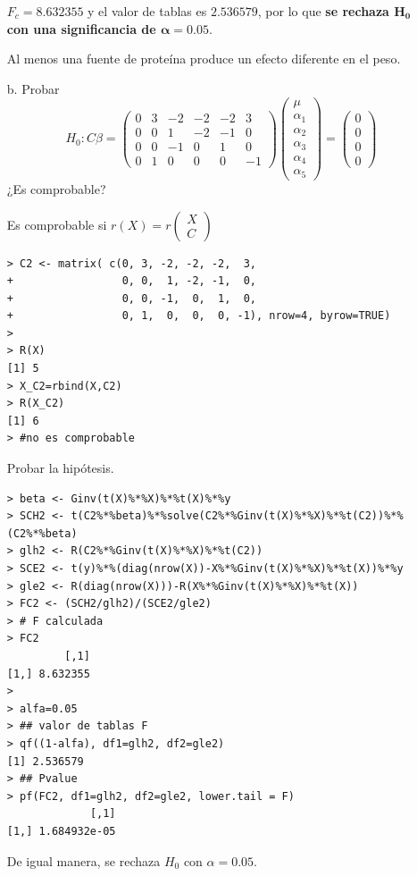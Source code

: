 \documentclass[12pt,a4paper]{report}
\begin{document}
\begin{enumerate}

$F_c = 8.632355$ y el valor de tablas es $2.536579$,  por lo que \textbf{se rechaza $\boldsymbol{H_0}$ con una significancia de $\boldsymbol{\alpha = 0.05}$}. 

Al menos una fuente de proteína produce un efecto diferente en el peso.




\item[b.] Probar
\[H_0: C\beta = \begin{pmatrix}
0 & 3 & -2 & -2 & -2 & 3 \\
0 & 0 & 1 & -2 & -1 & 0 \\
0 & 0 & -1 & 0 & 1 & 0 \\
0 & 1 & 0 & 0 & 0 & -1
\end{pmatrix}
\begin{pmatrix}
\mu \\ \alpha_1 \\ \alpha_2 \\ \alpha_3 \\ \alpha_4 \\ \alpha_5
\end{pmatrix} = \begin{pmatrix}
0 \\ 0 \\ 0 \\ 0
\end{pmatrix}\]
¿Es comprobable?


Es comprobable si $r(X)=r\begin{pmatrix} X \\ C \end{pmatrix}$


\begin{verbatim}
> C2 <- matrix( c(0, 3, -2, -2, -2,  3,
+                 0, 0,  1, -2, -1,  0,
+                 0, 0, -1,  0,  1,  0,
+                 0, 1,  0,  0,  0, -1), nrow=4, byrow=TRUE)
> 
> R(X)
[1] 5
> X_C2=rbind(X,C2)
> R(X_C2)
[1] 6
> #no es comprobable
\end{verbatim}

Probar la hipótesis.

\begin{verbatim}
> beta <- Ginv(t(X)%*%X)%*%t(X)%*%y
> SCH2 <- t(C2%*%beta)%*%solve(C2%*%Ginv(t(X)%*%X)%*%t(C2))%*%(C2%*%beta)
> glh2 <- R(C2%*%Ginv(t(X)%*%X)%*%t(C2))
> SCE2 <- t(y)%*%(diag(nrow(X))-X%*%Ginv(t(X)%*%X)%*%t(X))%*%y
> gle2 <- R(diag(nrow(X)))-R(X%*%Ginv(t(X)%*%X)%*%t(X))
> FC2 <- (SCH2/glh2)/(SCE2/gle2)
> # F calculada
> FC2                                        
         [,1]
[1,] 8.632355
> 
> alfa=0.05
> ## valor de tablas F
> qf((1-alfa), df1=glh2, df2=gle2)             
[1] 2.536579
> ## Pvalue
> pf(FC2, df1=glh2, df2=gle2, lower.tail = F)   
             [,1]
[1,] 1.684932e-05
\end{verbatim}


De igual manera, se rechaza $H_0$ con $\alpha = 0.05$.

\end{enumerate}
\end{document}
